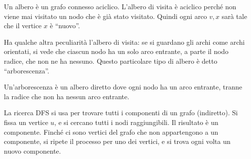 Un albero \`e un grafo connesso aciclico. L'albero di visita \`e aciclico perch\'e non viene mai visitato un nodo che \`e gi\`a stato visitato. Quindi ogni arco ${v,x}$ sar\`a tale che il vertice $x$ \`e ``nuovo''.

Ha qualche altra peculiarit\`a l'albero di visita: se si guardano gli archi come archi orientati, si vede che ciascun nodo ha un solo arco entrante, a parte il nodo radice, che non ne ha nessuno. Questo particolare tipo di albero \`e detto ``arborescenza''.

\begin{defn}[Arborescenza]
Un'arborescenza \`e un albero diretto dove ogni nodo ha un arco entrante, tranne la radice che non ha nessun arco entrante.
\end{defn}

La ricerca DFS si usa per trovare tutti i componenti di un grafo (indiretto). Si fissa un vertice $u$, e si cercano tutti i nodi raggiungibili. Il risultato \`e un componente. Finch\'e ci sono vertici del grafo che non appartengono a un componente, si ripete il processo per uno dei vertici, e si trova ogni volta un nuovo componente.

